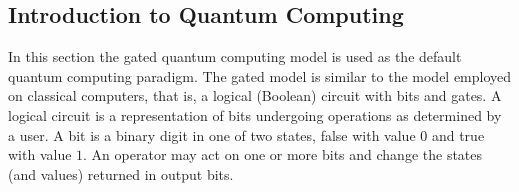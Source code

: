 \documentclass[../main.tex]{subfiles}
\begin{document}
\subsection{Introduction to Quantum Computing} \label{sec: intro_qm}
In this section the gated quantum computing model is used as the default quantum computing paradigm. The gated model is similar to the model employed on classical computers, that is, a logical (Boolean) circuit with bits and gates. A logical circuit is a representation of bits undergoing operations as determined by a user. A bit is a binary digit in one of two states, false with value $0$ and true with value $1$. An operator may act on one or more bits and change the states (and values) returned in output bits.
\par



\biblio
\end{document}

